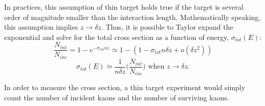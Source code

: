 In practices, this assumption of thin target holds true if the target is several order of magnitude smaller than the interaction length. Mathematically speaking, this assumption implies $z\rightarrow\delta z$. Thus, it is possible to Taylor expand the exponential and  solve for the total cross section as a function of energy, $\sigma_{tot}(E)$:
\begin{equation}\label{calc_sigma1}
\frac{N_{int}}{N_{inc}}=1-e^{-\sigma_{tot}n z}\simeq 1-(1-\sigma_{tot}n\delta z + o(\delta z^2)) 
\end{equation}
\begin{equation}\label{calc_sigma2}
\sigma_{tot}(E) \simeq \frac{1}{n\delta z} \Big(\frac{N_{int}}{N_{inc}}\Big) \text{ 	when $z\rightarrow\delta z$}.
\end{equation}

In order to measure the cross section, a thin target experiment would simply count the number of incident kaons and the number of surviving kaons.

